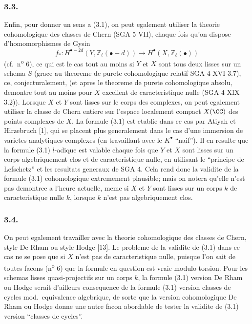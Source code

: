 \subsubsection*{3.3.}
Enfin, pour donner un sens a (3.1), on peut egalement utiliser la theorie cohomologique des classes de Chern (SGA 5 VII), chaque fois qu'on dispose d'homomorphismes de Gysin
\[
f_{*} : H^{\bullet-2d}(Y, \mathbb{Z}_{\ell}(\bullet-d)) \longrightarrow H^{\bullet}(X, \mathbb{Z}_{\ell}(\bullet))
\]
(cf.\ n\textsuperscript{o} 6), ce qui est le cas tout au moins si $Y$ et $X$ sont tous deux lisses sur un schema $S$ (grace au theoreme de purete cohomologique relatif SGA 4 XVI 3.7), ce, conjecturalement, (et apres le theoreme de purete cohomologique absolu, demontre tout au moins pour $X$ excellent de caracteristique nulle (SGA 4 XIX 3.2)). Lorsque $X$ et $Y$ sont lisses sur le corps des complexes, on peut egalement utiliser la classe de Chern entiere sur l'espace localement compact $X(\CC)$ des points complexes de $X$. La formule (3.1) est etablie dans ce cas par Atiyah et Hirzebruch [1], qui se placent plus generalement dans le cas d'une immersion de varietes analytiques complexes (en travaillant avec le $K^{\bullet}$ ``naif''). Il en resulte que la formule (3.1) $l$-adique est valable chaque fois que $Y$ et $X$ sont lisses sur un corps algebriquement clos et de caracteristique nulle, en utilisant le ``principe de Lefschetz'' et les resultats generaux de SGA 4. Cela rend donc la validite de la formule (3.1) cohomologique extremement plausible; mais on notera qu'elle n'est pas demontree a l'heure actuelle, meme si $X$ et $Y$ sont lisses sur un corps $k$ de caracteristique nulle $k$, lorsque $k$ n'est pas algebriquement clos.

\subsubsection*{3.4.}
On peut egalement travailler avec la theorie cohomologique des classes de Chern, style De Rham ou style Hodge [13]. Le probleme de la validite de (3.1) dans ce cas ne se pose que si $X$ n'est pas de caracteristique nulle, puisque l'on sait de toutes facons (n\textsuperscript{o} 6) que la formule en question est vraie modulo torsion. Pour les schemas lisses quasi-projectifs sur un corps $k$, la formule (3.1) version De Rham ou Hodge serait d'ailleurs consequence de la formule (3.1) version classes de cycles mod.\ equivalence algebrique, de sorte que la version cohomologique De Rham ou Hodge donne une autre facon abordable de tester la validite de (3.1) version ``classes de cycles''.

